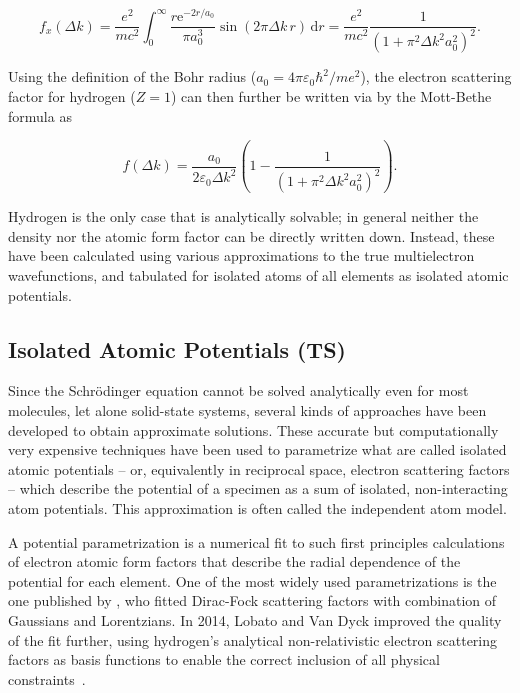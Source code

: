 \documentclass[%
 superscriptaddress,
 aip,
 amsmath,amssymb,
preprint,%
 author-year,%
longbibliography
]{revtex4-2}
\begin{document}
\begin{equation}
f_{x}(\Delta k) = \frac{e^2}{m c^2} \int_{0}^{\infty} \frac{r \mathrm{e}^{-2r / a_0}}{\pi a_0^{3}} \sin (2 \pi \Delta k \,r)\, \mathrm{d} r \nonumber
     = \frac{e^2}{m c^2}\frac{1}{\left(1+\pi^2 \Delta k^2 a_0^{2}\right)^{2}}.
\end{equation}

Using the definition of the Bohr radius ($a_{0}=4 \pi \varepsilon_{0} \hbar^{2} / m e^{2}$), the electron scattering factor for hydrogen ($Z = 1$) can then further be written via by the Mott-Bethe formula as 

\begin{equation}
f(\Delta k)=\frac{a_0}{2 \varepsilon_0 \Delta k^{2}} \left(1-\frac{1}{\left(1+\pi^2 \Delta k^2 a_0^{2}\right)^{2}}\right).
\end{equation}

Hydrogen is the only case that is analytically solvable; in general neither the density nor the atomic form factor can be directly written down. Instead, these have been calculated using various approximations to the true multielectron wavefunctions, and tabulated for isolated atoms of all elements as isolated atomic potentials.

\subsection*{Isolated Atomic Potentials (TS)}

Since the Schrödinger equation cannot be solved analytically even for most molecules, let alone solid-state systems, several kinds of approaches have been developed to obtain approximate solutions. These accurate but computationally very expensive techniques have been used to parametrize what are called isolated atomic potentials -- or, equivalently in reciprocal space, electron scattering factors -- which describe the potential of a specimen as a sum of isolated, non-interacting atom potentials. This approximation is often called the independent atom model.

A potential parametrization is a numerical fit to such first principles calculations of electron atomic form factors that describe the radial dependence of the potential for each element. One of the most widely used parametrizations is the one published by \cite{kirkland_advanced_2010}, who fitted Dirac-Fock scattering factors with combination of Gaussians and Lorentzians. In 2014, Lobato and Van Dyck improved the quality of the fit further, using hydrogen's analytical non-relativistic electron scattering factors as basis functions to enable the correct inclusion of all physical constraints~\cite{lobato_accurate_2014}.
\end{document}
